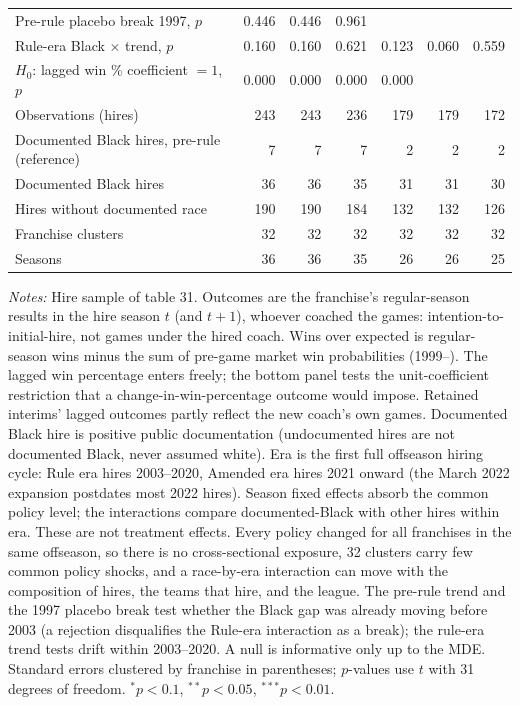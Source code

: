 \begin{table}[H]
{\begin{tabular}{lrrrrrr}
Pre-rule placebo break 1997, $p$ & 0.446 & 0.446 & 0.961 &  &  &  \\
Rule-era Black $\times$ trend, $p$ & 0.160 & 0.160 & 0.621 & 0.123 & 0.060 & 0.559 \\
$H_0$: lagged win \% coefficient $= 1$, $p$ & 0.000 & 0.000 & 0.000 & 0.000 &  &  \\
Observations (hires) & 243 & 243 & 236 & 179 & 179 & 172 \\
Documented Black hires, pre-rule (reference) & 7 & 7 & 7 & 2 & 2 & 2 \\
Documented Black hires & 36 & 36 & 35 & 31 & 31 & 30 \\
Hires without documented race & 190 & 190 & 184 & 132 & 132 & 126 \\
Franchise clusters & 32 & 32 & 32 & 32 & 32 & 32 \\
Seasons & 36 & 36 & 35 & 26 & 26 & 25 \\
\bottomrule
\end{tabular}
}
\par\smallskip
\begin{minipage}{\textwidth}
\footnotesize
\textit{Notes:} Hire sample of table 31. Outcomes are the franchise's regular-season results in the hire season $t$ (and $t+1$), whoever coached the games: intention-to-initial-hire, not games under the hired coach. Wins over expected is regular-season wins minus the sum of pre-game market win probabilities (1999--). The lagged win percentage enters freely; the bottom panel tests the unit-coefficient restriction that a change-in-win-percentage outcome would impose. Retained interims' lagged outcomes partly reflect the new coach's own games. Documented Black hire is positive public documentation (undocumented hires are not documented Black, never assumed white). Era is the first full offseason hiring cycle: Rule era hires 2003--2020, Amended era hires 2021 onward (the March 2022 expansion postdates most 2022 hires). Season fixed effects absorb the common policy level; the interactions compare documented-Black with other hires within era. These are not treatment effects. Every policy changed for all franchises in the same offseason, so there is no cross-sectional exposure, 32 clusters carry few common policy shocks, and a race-by-era interaction can move with the composition of hires, the teams that hire, and the league. The pre-rule trend and the 1997 placebo break test whether the Black gap was already moving before 2003 (a rejection disqualifies the Rule-era interaction as a break); the rule-era trend tests drift within 2003--2020. A null is informative only up to the MDE. Standard errors clustered by franchise in parentheses; $p$-values use $t$ with 31 degrees of freedom. $^{*}p<0.1$, $^{**}p<0.05$, $^{***}p<0.01$.
\end{minipage}
\end{table}
